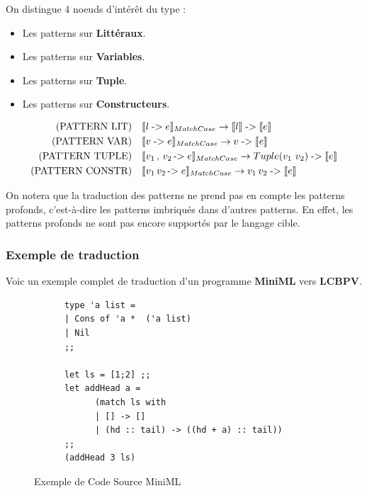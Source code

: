 \documentclass[12pt]{article}
\begin{document}
On distingue 4 noeuds d'intérêt du type :
\begin{itemize}
      \tightlist
      \item
            Les patterns sur \textbf{Littéraux}.
      \item
            Les patterns sur \textbf{Variables}.
      \item
            Les patterns sur \textbf{Tuple}.
      \item
            Les patterns sur \textbf{Constructeurs}.
\end{itemize}

\begin{align*}
      \text{(PATTERN LIT)} \quad    & \llbracket l \; \text{->} \; e \rrbracket_{MatchCase} \rightarrow \llbracket l \rrbracket \; \text{->} \; \llbracket e \rrbracket                \\
      \text{(PATTERN VAR)} \quad    & \llbracket v \; \text{->} \; e \rrbracket_{MatchCase} \rightarrow v \; \text{->} \; \llbracket e \rrbracket                                  \\
      \text{(PATTERN TUPLE)} \quad  & \llbracket v_1 \, , \, v_2 \, \text{->} \; e \rrbracket_{MatchCase} \rightarrow Tuple(v_1 \, \, v_2) \; \text{->} \; \llbracket e \rrbracket \\
      \text{(PATTERN CONSTR)} \quad & \llbracket v_1 \, v_2 \, \text{->} \; e \rrbracket_{MatchCase} \rightarrow v_1 \, v_2 \; \text{->} \; \llbracket e \rrbracket                \\
\end{align*}

On notera que la traduction des patterns ne prend pas en compte les patterns profonds, c'est-à-dire les patterns imbriqués dans d'autres patterns.
En effet, les patterns profonds ne sont pas encore supportés par le langage cible.

\pagebreak

\hypertarget{Exemple-de-Traduction}{%
      \subsubsection{Exemple de traduction}\label{Exemple-de-traduction}}
Voic un exemple complet de traduction d'un programme \textbf{MiniML} vers \textbf{LCBPV}.
\begin{figure}[!b]
      \centering
      \begin{verbatim}
      type 'a list = 
      | Cons of 'a *  ('a list)
      | Nil
      ;;
      
      let ls = [1;2] ;;
      let addHead a =
            (match ls with
            | [] -> []
            | (hd :: tail) -> ((hd + a) :: tail))
      ;;
      (addHead 3 ls)    
      \end{verbatim}
      \caption{Exemple de Code Source MiniML}
\end{figure}
\end{document}
